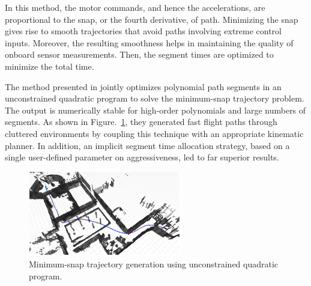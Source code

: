 In this method, the motor commands, and hence the accelerations, are proportional to the snap, or the fourth derivative, of path. Minimizing the snap gives rise to smooth trajectories that avoid paths involving extreme control inputs. Moreover, the resulting smoothness helps in maintaining the quality of onboard sensor measurements. Then, the segment times are optimized to minimize the total time. 




The method presented in  \cite{richter2016polynomial} jointly optimizes polynomial path segments in an unconstrained quadratic program to solve the minimum-snap trajectory problem. The output is numerically stable for high-order polynomials and large numbers of segments. As shown in Figure.~\ref{fig:bry_poly}, they generated fast flight paths through cluttered environments by coupling this technique with an appropriate kinematic planner. In addition, an implicit segment time allocation strategy, based on a single user-defined parameter on aggressiveness, led to far superior results.

\begin{figure}
\centering
\includegraphics[width=0.6\textwidth]{./images/bry_poly.png}
\caption{Minimum-snap trajectory generation using unconstrained quadratic program. \cite{richter2016polynomial}}
\label{fig:bry_poly}
\end{figure}

